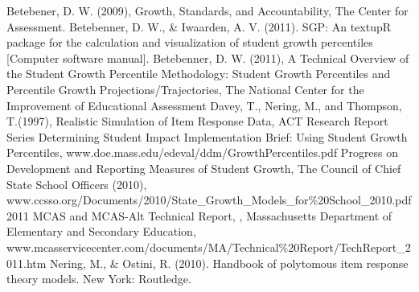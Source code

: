 \documentclass[reqno,12pt]{amsart}
\theoremstyle{plain}
\numberwithin{equation}{section} %
\numberwithin{figure}{section} %
\theoremstyle{remark}
\begin{document}
\begin{thebibliography}{99}

 Betebener, D. W. (2009), Growth, Standards, and Accountability, The Center for Assessment.
\vspace{0.5 cm}  
 Betebenner, D. W., \& Iwaarden, A. V. (2011). SGP: An textupR package for the calculation and
visualization of student growth percentiles [Computer software manual]. 
\vspace{0.5 cm}  
 Betebenner, D. W. (2011), A Technical Overview of the Student Growth Percentile Methodology: Student Growth Percentiles and Percentile Growth Projections/Trajectories, The National Center for the Improvement of Educational Assessment
\vspace{0.5 cm}  
 Davey, T., Nering, M., and Thompson, T.(1997), Realistic Simulation of Item Response Data, ACT Research Report Series
\vspace{0.5 cm}  
 Determining Student Impact Implementation Brief: Using Student Growth Percentiles, www.doe.mass.edu/edeval/ddm/GrowthPercentiles.pdf
\vspace{0.5 cm} 
 Progress on Development and Reporting Measures of Student Growth, The Council of Chief State School Officers (2010),\hfill 
\linebreak www.ccsso.org/Documents/2010/State\_Growth\_Models\_for\%20School\_2010.pdf
\vspace{0.5 cm}   
 2011 MCAS and MCAS-Alt Technical Report, \hfill, 
\linebreak Massachusetts Department of Elementary and Secondary Education,   
\linebreak www.mcasservicecenter.com/documents/MA/Technical\%20Report/TechReport\_2011.htm
\vspace{0.5 cm}  
 Nering, M., \& Ostini, R. (2010). Handbook of polytomous item response theory models. New York:
Routledge.
\end{thebibliography}
\end{document}
